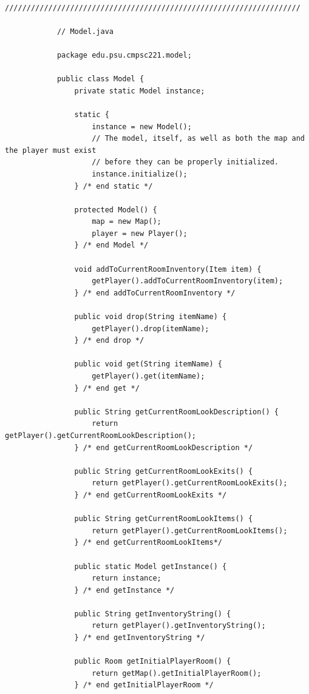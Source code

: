 \documentclass[a4paper, 11pt]{article}
\begin{document}
\begin{lstlisting}
            ////////////////////////////////////////////////////////////////////

            // Model.java

            package edu.psu.cmpsc221.model;

            public class Model {
                private static Model instance;

                static {
                    instance = new Model();
                    // The model, itself, as well as both the map and the player must exist
                    // before they can be properly initialized.
                    instance.initialize();
                } /* end static */

                protected Model() {
                    map = new Map();
                    player = new Player();
                } /* end Model */

                void addToCurrentRoomInventory(Item item) {
                    getPlayer().addToCurrentRoomInventory(item);
                } /* end addToCurrentRoomInventory */

                public void drop(String itemName) {
                    getPlayer().drop(itemName);
                } /* end drop */

                public void get(String itemName) {
                    getPlayer().get(itemName);
                } /* end get */

                public String getCurrentRoomLookDescription() {
                    return getPlayer().getCurrentRoomLookDescription();
                } /* end getCurrentRoomLookDescription */

                public String getCurrentRoomLookExits() {
                    return getPlayer().getCurrentRoomLookExits();
                } /* end getCurrentRoomLookExits */

                public String getCurrentRoomLookItems() {
                    return getPlayer().getCurrentRoomLookItems();
                } /* end getCurrentRoomLookItems*/

                public static Model getInstance() {
                    return instance;
                } /* end getInstance */

                public String getInventoryString() {
                    return getPlayer().getInventoryString();
                } /* end getInventoryString */

                public Room getInitialPlayerRoom() {
                    return getMap().getInitialPlayerRoom();
                } /* end getInitialPlayerRoom */


\end{lstlisting}
\end{document}
